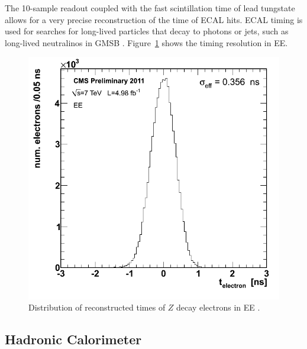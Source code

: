\documentclass[dissertation.tex]{subfiles}
\begin{document}
The 10-sample readout coupled with the fast scintillation time of lead tungstate allows for a very precise reconstruction of the time of ECAL hits.  ECAL timing is used for searches for long-lived particles that decay to photons or jets, such as long-lived neutralinos in GMSB \cite{CMS-PAS-EXO-11-067}.  Figure~\ref{fig:ECAL_timing_res} shows the timing resolution in EE.

\begin{figure}
	\centering
	\includegraphics[scale=0.3]{ECAL_timing_res}
	\caption{Distribution of reconstructed times of $Z$ decay electrons in EE \cite{ECAL_DPG_Twiki_timing_res}.}
	\label{fig:ECAL_timing_res}
\end{figure}

\subsection{Hadronic Calorimeter}
\end{document}
